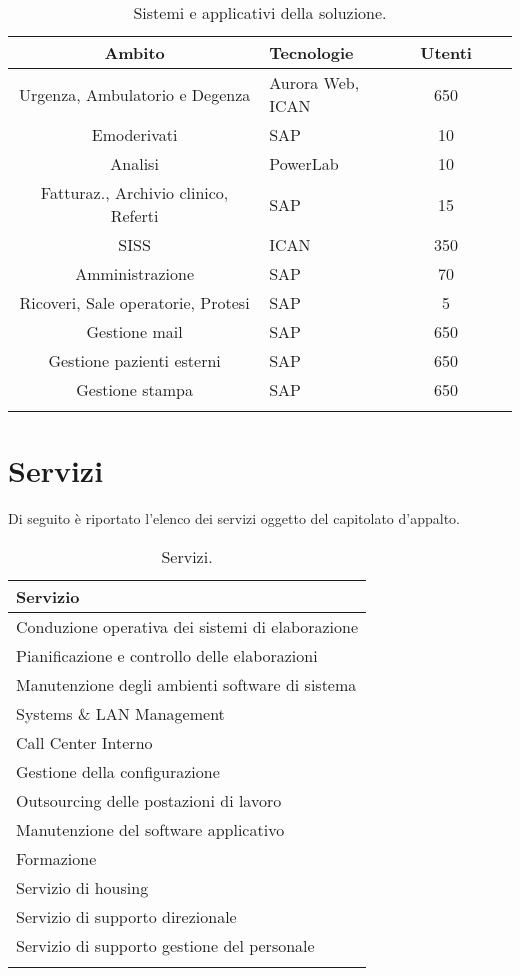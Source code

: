         \renewcommand\arraystretch{1.5}
        \begin{longtable}{c l c c c}
        \toprule
        \textbf{Ambito} & \textbf{Tecnologie} & \textbf{Utenti} \\
        \toprule
            \small{Urgenza, Ambulatorio e Degenza} & Aurora Web, ICAN &  650 \\
             Emoderivati & SAP & 10 \\
             Analisi & PowerLab & 10 \\
             \small{Fatturaz., Archivio clinico, Referti} & SAP &  15 \\
             SISS & ICAN & 350 \\
             Amministrazione & SAP & 70 \\
             \small{Ricoveri, Sale operatorie, Protesi} & SAP &  5 \\
             Gestione mail & SAP & 650 \\
             Gestione pazienti esterni & SAP  & 650 \\
             Gestione stampa & SAP & 650 \\
            \bottomrule
            \caption{Sistemi e applicativi della soluzione.}
        \end{longtable}
        
	\section{Servizi}
    	Di seguito è riportato l'elenco dei servizi oggetto del capitolato d'appalto.
        
        \renewcommand\arraystretch{1,5}
        \begin{longtable}{p{8cm}}
        \toprule
        \textbf{Servizio} \\
        \toprule
        Conduzione operativa dei sistemi di elaborazione  \\
        Pianificazione e controllo delle elaborazioni \\
        Manutenzione degli ambienti software di sistema \\
        Systems \& LAN Management \\
        Call Center Interno \\
        Gestione della configurazione \\
        Outsourcing delle postazioni di lavoro \\
        Manutenzione del software applicativo \\
        Formazione \\
        Servizio di housing \\
        Servizio di supporto direzionale \\
        Servizio di supporto gestione del personale \\
        \bottomrule
        \caption{Servizi.}
        \end{longtable}
        
